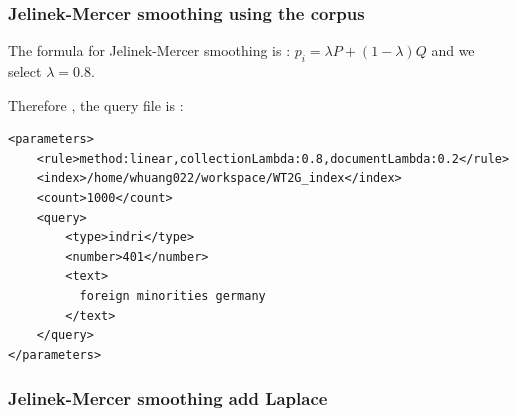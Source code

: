 \documentclass{article}
\begin{document}
\subsubsection{Jelinek-Mercer smoothing using the corpus}
The formula for Jelinek-Mercer smoothing is :
$
p_i=\lambda P + \left(1-\lambda\right)Q
$
and we select $\lambda=0.8 $.

Therefore , the query file is :

\lstset{language=XML}
\begin{lstlisting}[caption={jelinek\_mercer.xml}]
  <parameters>
	<rule>method:linear,collectionLambda:0.8,documentLambda:0.2</rule> 
	<index>/home/whuang022/workspace/WT2G_index</index>
	<count>1000</count>
	<query>
		<type>indri</type>
		<number>401</number>
		<text>
		  foreign minorities germany
		</text>
	</query>
</parameters>
\end{lstlisting}

\subsubsection{Jelinek-Mercer smoothing add Laplace}
\end{document}
